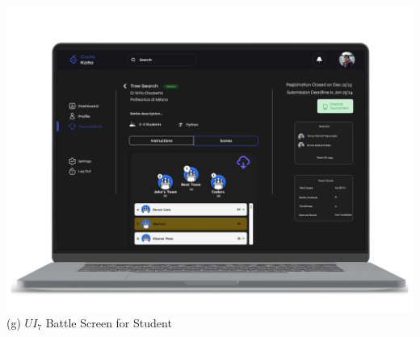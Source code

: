 \begin{center}
\includegraphics[scale=0.13]{Images/ui-ux/student_battle_4.png}
      (g) $UI_{7}$  Battle Screen for Student
\end{center}

